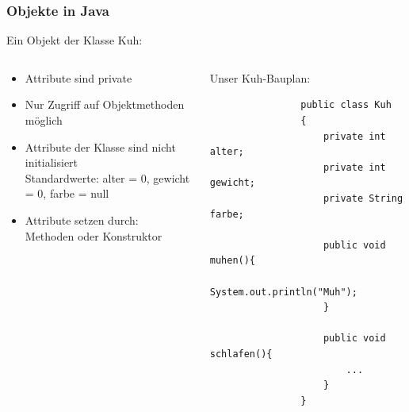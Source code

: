 \begin{frame}[fragile]
	\frametitle{Objekte in Java}
	Ein Objekt der Klasse Kuh:
	\begin{columns}
		\begin{column}{0.5\textwidth}
			\small
			\begin{itemize}
			  \item Attribute sind private
			  \item Nur Zugriff auf Objektmethoden m\"oglich
			  \item Attribute der Klasse sind nicht initialisiert\\
			  Standardwerte: alter = 0, gewicht = 0, farbe = null
			  \item Attribute setzen durch:\\
			  Methoden oder Konstruktor
			\end{itemize}
		\end{column}
		\begin{column}{0.5\textwidth}
		\small Unser Kuh-Bauplan:
			\begin{lstlisting}
				public class Kuh
				{
					private int alter;
					private int gewicht;
					private String farbe;
					
					public void muhen(){
						System.out.println("Muh");
					}
					
					public void schlafen(){
						...
					}
				} 
			\end{lstlisting}
		\end{column}
	\end{columns}
\end{frame}

